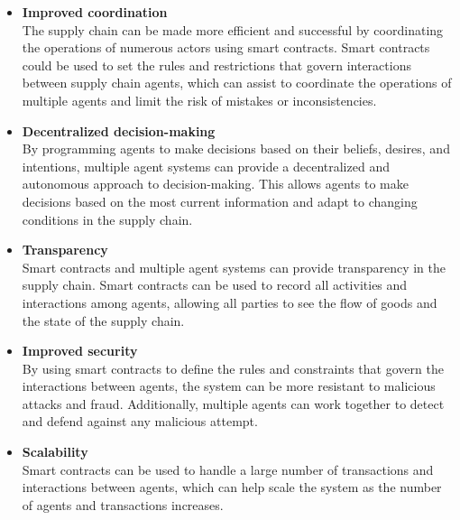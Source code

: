 \begin{itemize}
    
\item \textbf{Improved coordination} \\ The supply chain can be made more efficient and successful by coordinating the operations of numerous actors using smart contracts. Smart contracts could be used to set the rules and restrictions that govern interactions between supply chain agents, which can assist to coordinate the operations of multiple agents and limit the risk of mistakes or inconsistencies.

\vspace{.5cm}

\item \textbf{Decentralized decision-making} \\ By programming agents to make decisions based on their beliefs, desires, and intentions, multiple agent systems can provide a decentralized and autonomous approach to decision-making. This allows agents to make decisions based on the most current information and adapt to changing conditions in the supply chain.

\vspace{.5cm}

\item \textbf{Transparency} \\ Smart contracts and multiple agent systems can provide transparency in the supply chain. Smart contracts can be used to record all activities and interactions among agents, allowing all parties to see the flow of goods and the state of the supply chain.

\vspace{.5cm}

\item \textbf{Improved security} \\ By using smart contracts to define the rules and constraints that govern the interactions between agents, the system can be more resistant to malicious attacks and fraud. Additionally, multiple agents can work together to detect and defend against any malicious attempt.

\vspace{.5cm}

\item \textbf{Scalability} \\ Smart contracts can be used to handle a large number of transactions and interactions between agents, which can help scale the system as the number of agents and transactions increases.


\end{itemize}
